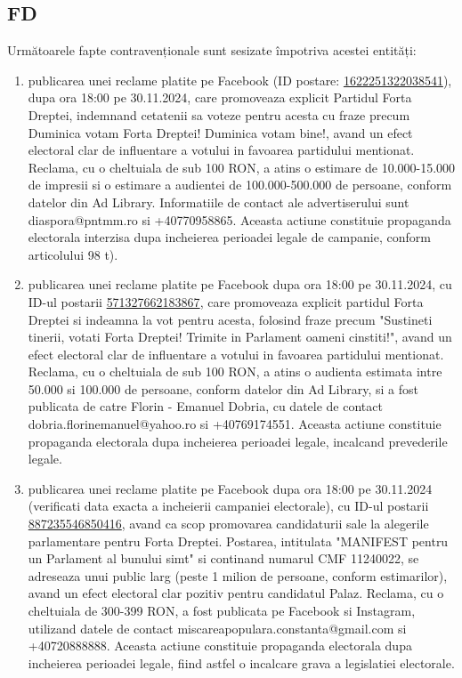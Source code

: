 \documentclass[a4paper,12pt]{article}
\begin{document}
\vspace{0.5cm}

\subsection{FD}
Următoarele fapte contravenționale sunt sesizate împotriva acestei entități:

\begin{enumerate}[leftmargin=*, label=\arabic*.)]
    \item publicarea unei reclame platite pe Facebook (ID postare: \href{https://www.facebook.com/ads/library/?id=1622251322038541}{1622251322038541}), dupa ora 18:00 pe 30.11.2024, care promoveaza explicit Partidul Forta Dreptei, indemnand cetatenii sa voteze pentru acesta cu fraze precum Duminica votam Forta Dreptei! Duminica votam bine!, avand un efect electoral clar de influentare a votului in favoarea partidului mentionat.  Reclama, cu o cheltuiala de sub 100 RON, a atins o estimare de 10.000-15.000 de impresii si o estimare a audientei de 100.000-500.000 de persoane, conform datelor din Ad Library.  Informatiile de contact ale advertiserului sunt diaspora@pntmm.ro si +40770958865.  Aceasta actiune constituie propaganda electorala interzisa dupa incheierea perioadei legale de campanie, conform articolului 98 t).
    \item publicarea unei reclame platite pe Facebook dupa ora 18:00 pe 30.11.2024, cu ID-ul postarii \href{https://www.facebook.com/ads/library/?id=571327662183867}{571327662183867}, care promoveaza explicit partidul Forta Dreptei si indeamna la vot pentru acesta, folosind fraze precum "Sustineti tinerii, votati Forta Dreptei! Trimite in Parlament oameni cinstiti!", avand un efect electoral clar de influentare a votului in favoarea partidului mentionat. Reclama, cu o cheltuiala de sub 100 RON, a atins o audienta estimata intre 50.000 si 100.000 de persoane, conform datelor din Ad Library, si a fost publicata de catre Florin - Emanuel Dobria, cu datele de contact dobria.florinemanuel@yahoo.ro si +40769174551.  Aceasta actiune constituie propaganda electorala dupa incheierea perioadei legale, incalcand prevederile legale.
    \item publicarea unei reclame platite pe Facebook dupa ora 18:00 pe 30.11.2024 (verificati data exacta a incheierii campaniei electorale), cu ID-ul postarii \href{https://www.facebook.com/ads/library/?id=887235546850416}{887235546850416},  avand ca scop promovarea candidaturii sale la alegerile parlamentare pentru Forta Dreptei. Postarea, intitulata "MANIFEST pentru un Parlament al bunului simt" si continand numarul CMF 11240022, se adreseaza unui public larg (peste 1 milion de persoane, conform estimarilor), avand un efect electoral clar pozitiv pentru candidatul Palaz.  Reclama, cu o cheltuiala de 300-399 RON, a fost publicata pe Facebook si Instagram,  utilizand datele de contact miscareapopulara.constanta@gmail.com si +40720888888.  Aceasta actiune constituie propaganda electorala dupa incheierea perioadei legale, fiind astfel o incalcare grava a legislatiei electorale.
\end{enumerate}
\end{document}
